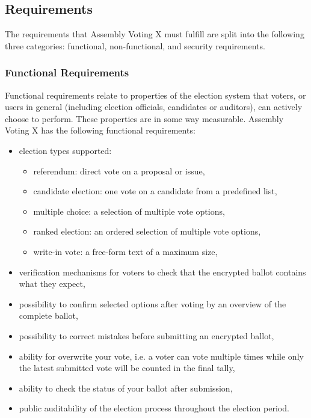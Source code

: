 \subsection{Requirements} \label{sec: requirements}
The requirements that Assembly Voting X must fulfill are split into the following three categories: functional, non-functional, and security requirements.


\subsubsection{Functional Requirements} \label{sec: functional requirements}
Functional requirements relate to properties of the election system that voters, or users in general (including election officials, candidates or auditors), can actively choose to perform. These properties are in some way measurable. Assembly Voting X has the following functional requirements:

\begin{itemize}
    \item election types supported:
    \begin{itemize}
        \item referendum: direct vote on a proposal or issue,
        \item candidate election: one vote on a candidate from a predefined list,
        \item multiple choice: a selection of multiple vote options,
        \item ranked election: an ordered selection of multiple vote options,
        \item write-in vote: a free-form text of a maximum size,
    \end{itemize}
    \item verification mechanisms for voters to check that the encrypted ballot contains what they expect,
    \item possibility to confirm selected options after voting by an overview of the complete ballot,
    \item possibility to correct mistakes before submitting an encrypted ballot,
    \item ability for overwrite your vote, i.e. a voter can vote multiple times while only the latest submitted vote will be counted in the final tally,
    \item ability to check the status of your ballot after submission,
    \item public auditability of the election process throughout the election period.
\end{itemize}


